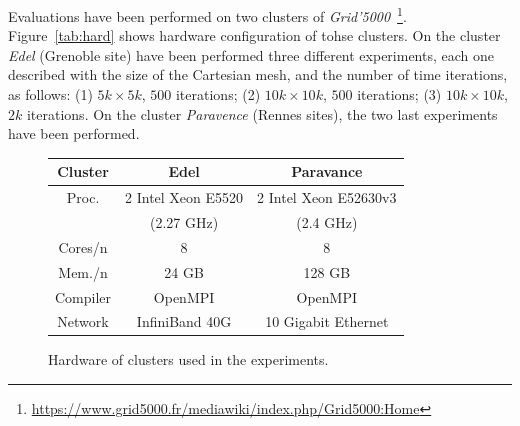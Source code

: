 Evaluations have been performed on two clusters of \emph{Grid'5000}~\footnote{\url{https://www.grid5000.fr/mediawiki/index.php/Grid5000:Home}}. Figure~\ref{tab:hard} shows hardware configuration of tohse clusters. On the cluster \emph{Edel} (Grenoble site) have been performed three different experiments, each one described with the size of the Cartesian mesh, and the number of time iterations, as follows: (1) $5k \times 5k$, $500$ iterations; (2) $10k \times 10k$, $500$ iterations; (3) $10k \times 10k$, $2k$ iterations. On the cluster \emph{Paravence} (Rennes sites), the two last experiments have been performed.

\begin{figure}[!h]
\begin{center}
 \begin{tabular}{|c|c|c|}
\hline
    Cluster & \textbf{Edel} & \textbf{Paravance}\\
     \hline         
    Proc. & 2 Intel Xeon E5520 & 2 Intel Xeon E52630v3\\
    & (2.27 GHz) & (2.4 GHz)\\
    Cores/n & 8 & 8\\
    Mem./n & 24 GB & 128 GB\\
    Compiler & OpenMPI & OpenMPI\\
    Network & InfiniBand 40G & 10 Gigabit Ethernet\\
\hline
 \end{tabular}
   \caption{\label{tab:grappe}Hardware of clusters used in the experiments.}
 \end{center}
\end{figure}

